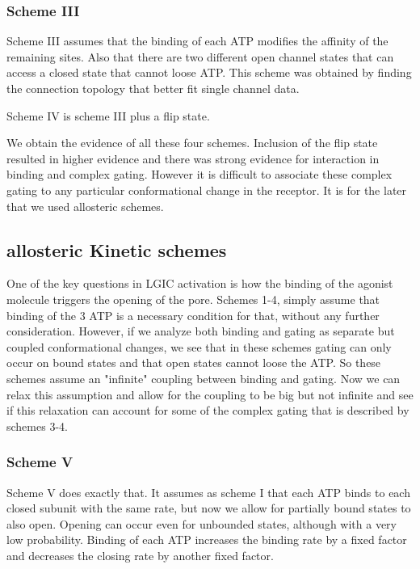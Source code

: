 \documentclass[pdflatex,sn-mathphys-num]{sn-jnl}%
\theoremstyle{thmstyleone}%
\theoremstyle{thmstyletwo}%
\theoremstyle{thmstylethree}%
\begin{document}
\subsubsection{Scheme III} \label{scheme I}
Scheme III assumes that the binding of each ATP modifies the affinity of the remaining sites. Also that there are two different open channel states that can access a closed state that cannot loose ATP. This scheme was obtained by finding the connection topology that better fit single channel data. 

Scheme IV is scheme III plus a flip state. 

We obtain the evidence of all these four schemes. Inclusion of the flip state resulted in higher evidence and there was strong evidence for interaction in binding and complex gating. 
However it is difficult to associate these complex gating to any particular conformational change in the receptor. It is for the later that we used allosteric schemes. 

\subsection{allosteric Kinetic schemes}\label{subsec2}
One of the key questions in LGIC activation is how the binding of the agonist molecule triggers the opening of the pore. Schemes 1-4, simply assume that binding of the 3 ATP is a necessary condition for that, without any further consideration. 
However, if we analyze both binding and gating as separate but coupled conformational changes, we see that in these schemes gating can only occur on bound states and that open states cannot loose the ATP. So these schemes assume an "infinite" coupling between binding and gating. Now we can relax this assumption and allow for the coupling to be big but not infinite and see if this relaxation can account for some of the complex gating that is described by schemes 3-4. 
\subsubsection{Scheme V} \label{scheme VI}
Scheme V does exactly that. It assumes as scheme I that each ATP binds to each closed subunit with the same rate, but now we allow for partially bound states to also open. Opening can occur even for unbounded states, although with a very low probability. Binding of each ATP increases the binding rate by a fixed factor and decreases the closing rate by another fixed factor. 
\end{document}

